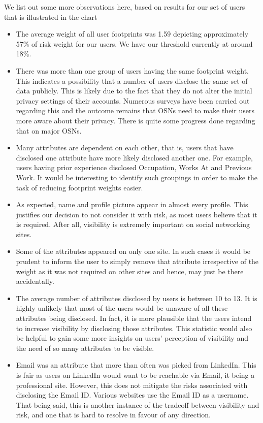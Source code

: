 \documentclass[10pt,conference]{IEEEtran}
\begin{document}
We list out some more observations here, based on results for our set of users that is illustrated in the chart
\begin{itemize}
\item The average weight of all user footprints was 1.59 depicting approximately 57\% of risk weight for our users. We have our threshold currently at around 18\%. 
\item There was more than one group of users having the same footprint weight. This indicates a possibility that a number of users disclose the same set of data publicly. This is likely due to the fact that they do not alter the initial privacy settings of their accounts. Numerous surveys have been carried out regarding this and the outcome remains that OSNs need to make their users more aware about their privacy. There is quite some progress done regarding that on major OSNs.
\item Many attributes are dependent on each other, that is, users that have disclosed one attribute have more likely disclosed another one. For example, users having prior experience disclosed Occupation, Works At and Previous Work. It would be interesting to identify such groupings in order to make the task of reducing footprint weights easier.
\item As expected, name and profile picture appear in almost every profile. This justifies our decision to not consider it with risk, as most users believe that it is required. After all, visibility is extremely important on social networking sites.
\item Some of the attributes appeared on only one site. In such cases it would be prudent to inform the user to simply remove that attribute irrespective of the weight as it was not required on other sites and hence, may just be there accidentally.
\item The average number of attributes disclosed by users is between 10 to 13. It is highly unlikely that most of the users would be unaware of all these attributes being disclosed. In fact, it is more plausible that the users intend to increase visibility by disclosing those attributes. This statistic would also be helpful to gain some more insights on users' perception of visibility and the need of so many attributes to be visible.
\item Email was an attribute that more than often was picked from LinkedIn. This is fair as users on LinkedIn would want to be reachable via Email, it being a professional site. However, this does not mitigate the risks associated with disclosing the Email ID. Various websites use the Email ID as a username. That being said, this is another instance of the tradeoff between visibility and risk, and one that is hard to resolve in favour of any direction.

\end{itemize}
\end{document}
